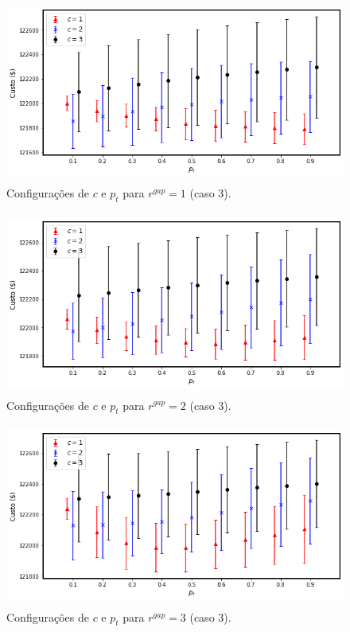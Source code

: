 \documentclass[
	12pt,				%
	openany,			%
	twoside,			%
	a4paper,			%
	chapter=TITLE,		%
	section=Title,		%
	subsection=Title,	%
	subsubsection=Title,%
	english,			%
	french,				%
	spanish,			%
	brazil			%
	]{abntex2}
\begin{document}
\begin{ERRATA}
\begin{apendicesenv}
\begin{figure}[h]
\end{figure}

\begin{figure} [h]
    \centering
    \caption{\label{rgap1_40}Configurações de $c$ e $p_t$ para $r^{gap}=1$ (caso 3).}
    \includegraphics[width=120mm, height=60mm]{images/rgap1_40.png}
\end{figure}


\begin{figure}[h]
    \caption{\label{rgap2_40}Configurações de $c$ e $p_t$ para $r^{gap}=2$ (caso 3).}
    \centering
    \includegraphics[width=120mm, height=60mm]{images/rgap2_40.png}

\end{figure}

\begin{figure}[h]
    \caption{\label{rgap3_40}Configurações de $c$ e $p_t$ para $r^{gap}=3$ (caso 3).}
    \centering
    \includegraphics[width=120mm, height=60mm]{images/rgap3_40.png}
\end{figure}


\end{apendicesenv}
\end{ERRATA}
\end{document}
